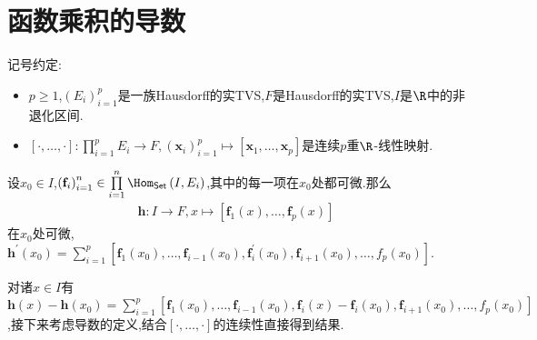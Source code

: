 \section{函数乘积的导数}

记号约定:
\begin{itemize}
	\item $p\geq 1$,$\left(E_{i}\right)_{i=1}^{p}$是一族Hausdorff的实TVS,$F$是Hausdorff的实TVS,$I$是$\R$中的非退化区间.
	\item $\left[\cdot,\ldots,\cdot\right]:\prod\limits_{i=1}^{p}E_{i}\to F,\left(\mathbf{x}_{i}\right)_{i=1}^{p}\mapsto\left[\mathbf{x}_{1},\ldots,\mathbf{x}_{p}\right]$是连续$p$重$\R$-线性映射.
\end{itemize}

\begin{proposition}{}{}
	设$x_{0}\in I$,$\left(\mathbf{f}_{i}\right)_{i=1}^{n}\in\prod\limits_{i=1}^{n}\Hom_{\mathsf{Set}}\left(I,E_{i}\right)$,其中的每一项在$x_{0}$处都可微.那么
	\begin{align*}
		\mathbf{h}:I\to F,x\mapsto\left[\mathbf{f}_{1}\left(x\right),\ldots,\mathbf{f}_{p}\left(x\right)\right]
	\end{align*}
	在$x_{0}$处可微,$\mathbf{h}^{\prime}\left(x_{0}\right)=\sum\limits_{i=1}^{p}\left[\mathbf{f}_{1}\left(x_{0}\right),\ldots,\mathbf{f}_{i-1}\left(x_{0}\right),\mathbf{f}_{i}^{\prime}\left(x_{0}\right),\mathbf{f}_{i+1}\left(x_{0}\right),\ldots,f_{p}\left(x_{0}\right)\right]$.
\end{proposition}

\begin{sketch}{}{}
	对诸$x\in I$有$\mathbf{h}\left(x\right)-\mathbf{h}\left(x_{0}\right)=\sum\limits_{i=1}^{p}\left[\mathbf{f}_{1}\left(x_{0}\right),\ldots,\mathbf{f}_{i-1}\left(x_{0}\right),\mathbf{f}_{i}\left(x\right)-\mathbf{f}_{i}\left(x_{0}\right),\mathbf{f}_{i+1}\left(x_{0}\right),\ldots,f_{p}\left(x_{0}\right)\right]$,接下来考虑导数的定义,结合$\left[\cdot,\ldots,\cdot\right]$的连续性直接得到结果.
\end{sketch}

